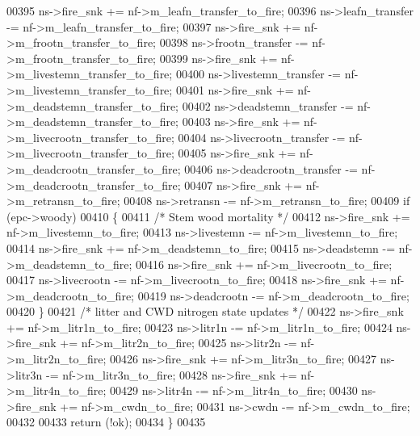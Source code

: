 \begin{DoxyCode}
00395     ns->fire\_snk            += nf->m\_leafn\_transfer\_to\_fire;
00396     ns->leafn\_transfer      -= nf->m\_leafn\_transfer\_to\_fire;
00397     ns->fire\_snk            += nf->m\_frootn\_transfer\_to\_fire;
00398     ns->frootn\_transfer     -= nf->m\_frootn\_transfer\_to\_fire;
00399     ns->fire\_snk            += nf->m\_livestemn\_transfer\_to\_fire;
00400     ns->livestemn\_transfer  -= nf->m\_livestemn\_transfer\_to\_fire;
00401     ns->fire\_snk            += nf->m\_deadstemn\_transfer\_to\_fire;
00402     ns->deadstemn\_transfer  -= nf->m\_deadstemn\_transfer\_to\_fire;
00403     ns->fire\_snk            += nf->m\_livecrootn\_transfer\_to\_fire;
00404     ns->livecrootn\_transfer -= nf->m\_livecrootn\_transfer\_to\_fire;
00405     ns->fire\_snk            += nf->m\_deadcrootn\_transfer\_to\_fire;
00406     ns->deadcrootn\_transfer -= nf->m\_deadcrootn\_transfer\_to\_fire;
00407     ns->fire\_snk            += nf->m\_retransn\_to\_fire;
00408     ns->retransn            -= nf->m\_retransn\_to\_fire;
00409     \textcolor{keywordflow}{if} (epc->woody)
00410     \{
00411         \textcolor{comment}{/*    Stem wood mortality */}
00412         ns->fire\_snk   += nf->m\_livestemn\_to\_fire;
00413         ns->livestemn  -= nf->m\_livestemn\_to\_fire;
00414         ns->fire\_snk   += nf->m\_deadstemn\_to\_fire;
00415         ns->deadstemn  -= nf->m\_deadstemn\_to\_fire;
00416         ns->fire\_snk   += nf->m\_livecrootn\_to\_fire;
00417         ns->livecrootn -= nf->m\_livecrootn\_to\_fire;
00418         ns->fire\_snk   += nf->m\_deadcrootn\_to\_fire;
00419         ns->deadcrootn -= nf->m\_deadcrootn\_to\_fire;
00420     \}
00421     \textcolor{comment}{/* litter and CWD nitrogen state updates */}
00422     ns->fire\_snk += nf->m\_litr1n\_to\_fire;
00423     ns->litr1n   -= nf->m\_litr1n\_to\_fire;
00424     ns->fire\_snk += nf->m\_litr2n\_to\_fire;
00425     ns->litr2n   -= nf->m\_litr2n\_to\_fire;
00426     ns->fire\_snk += nf->m\_litr3n\_to\_fire;
00427     ns->litr3n   -= nf->m\_litr3n\_to\_fire;
00428     ns->fire\_snk += nf->m\_litr4n\_to\_fire;
00429     ns->litr4n   -= nf->m\_litr4n\_to\_fire;
00430     ns->fire\_snk += nf->m\_cwdn\_to\_fire;
00431     ns->cwdn     -= nf->m\_cwdn\_to\_fire;
00432     
00433     \textcolor{keywordflow}{return} (!ok);
00434 \}
00435 
\end{DoxyCode}
